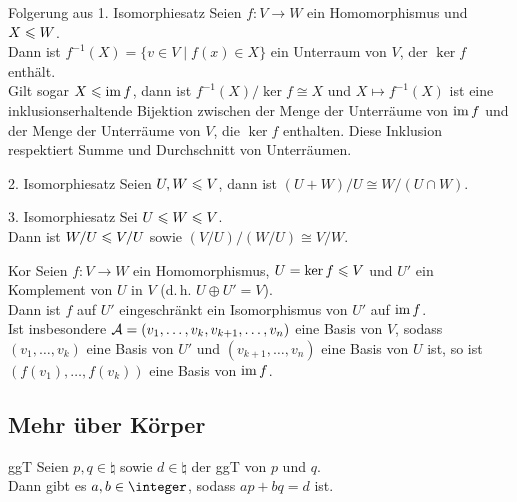 \begin{Satz}{Folgerung aus 1. Isomorphiesatz}
    Seien $f: V \rightarrow W$ ein Homomorphismus und $X \leqslant W$. \\
    Dann ist $f^{-1}(X) = \{v \in V \;|\; f(x) \in X\}$ ein Unterraum von
    $V$, der $\ker f$ enthält. \\
    Gilt sogar $X \leqslant \operatorname{im} f$, dann ist $f^{-1}(X) / \ker f \cong X$ und
    $X \mapsto f^{-1}(X)$ ist eine inklusionserhaltende Bijektion zwischen
    der Menge der Unterräume von $\operatorname{im} f$ und der Menge der Unterräume von
    $V$, die $\ker f$ enthalten.
    Diese Inklusion respektiert Summe und Durchschnitt von Unterräumen.
\end{Satz}

\begin{Satz}{2. Isomorphiesatz}
    Seien $U, W \leqslant V$, dann ist
    $(U + W)/U \cong W/(U \cap W)$.
\end{Satz}

\begin{Satz}{3. Isomorphiesatz}
    Sei $U \leqslant W \leqslant V$. \\
    Dann ist $W/U \leqslant V/U$ sowie
    $(V/U)\big/(W/U) \cong V/W$.
\end{Satz}

\begin{Satz}{Kor}
    Seien $f: V \rightarrow W$ ein Homomorphismus, $U = \ker f \leqslant V$
    und $U'$ ein Komplement von $U$ in $V$ (d.\,h. $U \oplus U' = V$). \\
    Dann ist $f$ auf $U'$ eingeschränkt ein Isomorphismus von $U'$ auf
    $\operatorname{im} f$. \\
    Ist insbesondere $\mathcal{A} = (v_1, \ldots, v_k, v_{k+1}, \ldots, v_n)$
    eine Basis von $V$, sodass $(v_1, \ldots, v_k)$ eine Basis von $U'$ und
    $(v_{k+1}, \ldots, v_n)$ eine Basis von $U$ ist, so ist
    $(f(v_1), \ldots, f(v_k))$ eine Basis von $\operatorname{im} f$.
\end{Satz}

\pagebreak

\subsection{%
    Mehr über Körper%
}

\begin{Lemma}{ggT}
    Seien $p, q \in \natural$ sowie $d \in \natural$ der ggT von $p$ und
    $q$. \\
    Dann gibt es $a, b \in \integer$, sodass $ap + bq = d$ ist.
\end{Lemma}

